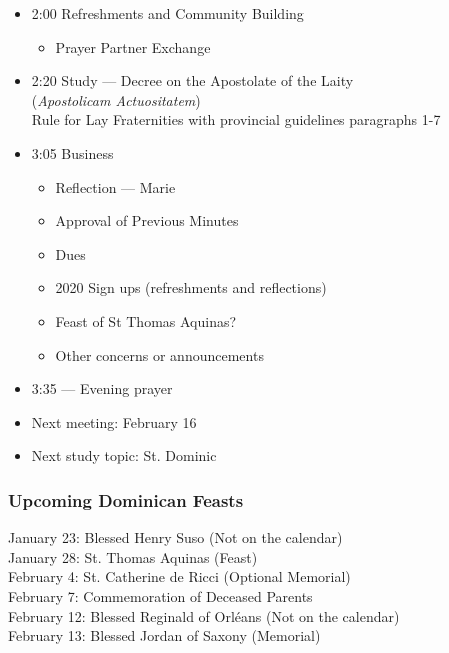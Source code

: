 \documentclass[letterpaper,14pt]{extarticle}
\begin{document}

\begin{itemize}
	\item 2:00 Refreshments and Community Building
	\begin{itemize}
		\item Prayer Partner Exchange
	\end{itemize}
	\item 2:20 Study --- Decree on the Apostolate of the Laity \\ (\textit{Apostolicam Actuositatem}) \\ 
	Rule for Lay Fraternities with provincial guidelines paragraphs 1-7

\item 3:05 Business
	\begin{itemize}
		\item Reflection --- Marie
		\item Approval of Previous Minutes
		\item Dues
		\item 2020 Sign ups (refreshments and reflections)
		\item Feast of St Thomas Aquinas?
		\item Other concerns or announcements
	\end{itemize}
	\item 3:35 --- Evening prayer
	\item Next meeting: February 16
	\item Next study topic: St. Dominic
\end{itemize}
\subsubsection*{Upcoming Dominican Feasts}
January 23: Blessed Henry Suso (Not on the calendar)\\
January 28: St. Thomas Aquinas (Feast)\\
February 4: St. Catherine de Ricci (Optional Memorial)\\
February 7: Commemoration of Deceased Parents\\
February 12: Blessed Reginald of Orl\'{e}ans (Not on the calendar)\\
February 13: Blessed Jordan of Saxony (Memorial)
\pagebreak
{}
\end{document}
